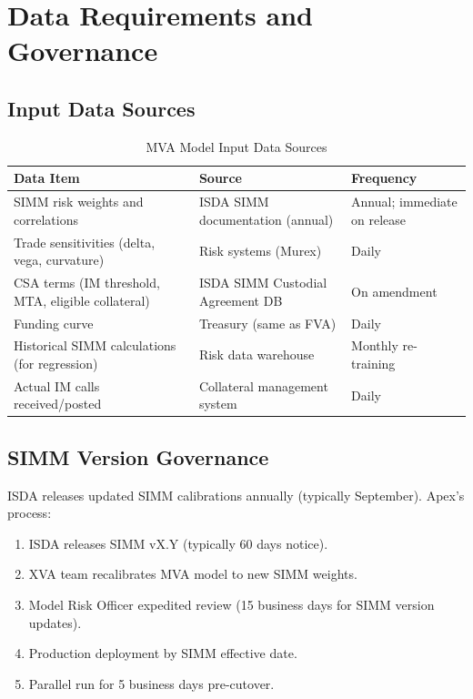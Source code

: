 \documentclass[11pt,a4paper]{article}
\begin{document}
\section{Data Requirements and Governance}

\subsection{Input Data Sources}

\begin{table}[h!]
\centering
\caption{MVA Model Input Data Sources}
\begin{tabular}{@{}lll@{}}
\toprule
\textbf{Data Item} & \textbf{Source} & \textbf{Frequency} \\
\midrule
SIMM risk weights and correlations & ISDA SIMM documentation (annual) & Annual; immediate on release \\
Trade sensitivities (delta, vega, curvature) & Risk systems (Murex) & Daily \\
CSA terms (IM threshold, MTA, eligible collateral) & ISDA SIMM Custodial Agreement DB & On amendment \\
Funding curve & Treasury (same as FVA) & Daily \\
Historical SIMM calculations (for regression) & Risk data warehouse & Monthly re-training \\
Actual IM calls received/posted & Collateral management system & Daily \\
\bottomrule
\end{tabular}
\end{table}

\subsection{SIMM Version Governance}

ISDA releases updated SIMM calibrations annually (typically September). Apex's process:
\begin{enumerate}[leftmargin=*]
  \item ISDA releases SIMM vX.Y (typically 60 days notice).
  \item XVA team recalibrates MVA model to new SIMM weights.
  \item Model Risk Officer expedited review (15 business days for SIMM version updates).
  \item Production deployment by SIMM effective date.
  \item Parallel run for 5 business days pre-cutover.
\end{enumerate}
\end{document}
